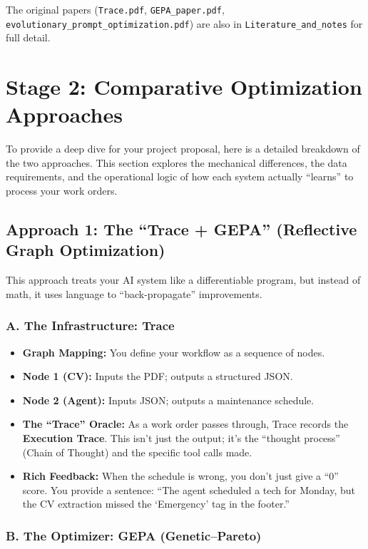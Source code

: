 \documentclass[11pt,a4paper]{article}
\begin{document}
The original papers (\texttt{Trace.pdf}, \texttt{GEPA\_paper.pdf}, \texttt{evolutionary\_prompt\_optimization.pdf}) are also in \texttt{Literature\_and\_notes} for full detail.

\section{Stage 2: Comparative Optimization Approaches}

To provide a deep dive for your project proposal, here is a detailed breakdown of the two approaches. This section explores the mechanical differences, the data requirements, and the operational logic of how each system actually ``learns'' to process your work orders.

\subsection{Approach 1: The ``Trace + GEPA'' (Reflective Graph Optimization)}

This approach treats your AI system like a differentiable program, but instead of math, it uses language to ``back-propagate'' improvements.

\subsubsection{A. The Infrastructure: Trace}

\begin{itemize}
  \item \textbf{Graph Mapping:} You define your workflow as a sequence of nodes.
  \item \textbf{Node 1 (CV):} Inputs the PDF; outputs a structured JSON.
  \item \textbf{Node 2 (Agent):} Inputs JSON; outputs a maintenance schedule.
  \item \textbf{The ``Trace'' Oracle:} As a work order passes through, Trace records the \textbf{Execution Trace}. This isn't just the output; it's the ``thought process'' (Chain of Thought) and the specific tool calls made.
  \item \textbf{Rich Feedback:} When the schedule is wrong, you don't just give a ``0'' score. You provide a sentence: ``The agent scheduled a tech for Monday, but the CV extraction missed the `Emergency' tag in the footer.''
\end{itemize}

\subsubsection{B. The Optimizer: GEPA (Genetic--Pareto)}
\end{document}
